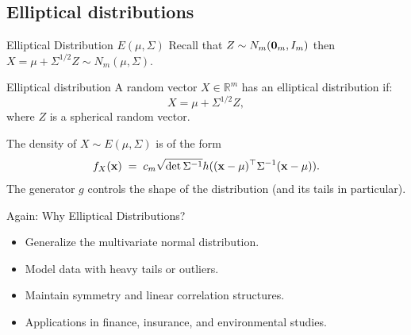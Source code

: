 \documentclass[11pt,handout,aspectratio=169]{beamer}
\begin{document}
\subsection{Elliptical distributions}

\begin{frame}{Elliptical Distribution $E(\mu,\Sigma)$}
Recall that $Z\sim N_m(\boldsymbol 0_m,I_m)$ then $X=\mu+\Sigma^{1/2}Z\sim N_m(\mu,\Sigma)$.
\begin{block}{Elliptical distribution}
A random vector $X \in \mathbb{R}^m$ has an elliptical distribution if:
  \begin{equation*}
    X = \mu + \Sigma^{1/2} Z,
  \end{equation*}
  where $Z$ is a spherical random vector.	
\end{block}
The density of $X\sim E(\mu,\Sigma)$ is of the form $$f_X(\mathbf{x})\;=\;c_m \sqrt{\det{\Sigma^{-1}}}h((\mathbf{x}-\mu)^\top\Sigma^{-1}(\mathbf{x}-\mu)).$$
The generator $g$ controls the shape of the distribution (and its tails in particular). 
\end{frame}

\begin{frame}{Again: Why Elliptical Distributions?}
    \begin{itemize}
        \item Generalize the multivariate normal distribution.\\[5mm]
        \item Model data with heavy tails or outliers.\\[5mm]
        \item Maintain symmetry and linear correlation structures.\\[5mm]
        \item Applications in finance, insurance, and environmental studies.
    \end{itemize}
\end{frame}
\end{document}
